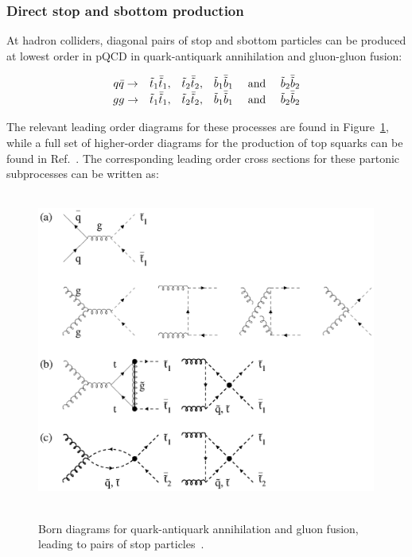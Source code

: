 \subsubsection{Direct stop and sbottom production}

At hadron colliders, diagonal pairs of stop and sbottom particles can be produced at lowest order in pQCD in quark-antiquark annihilation and gluon-gluon fusion:

\begin{equation}
\begin{matrix}
q \bar{q} \rightarrow & \tilde{t}_1 \bar{\tilde{t}}_1, & \tilde{t}_2 \bar{\tilde{t}}_2, & \tilde{b}_1 \bar{\tilde{b}}_1 &\text{  and  } & \tilde{b}_2 \bar{\tilde{b}}_2\\
gg        \rightarrow & \tilde{t}_1 \bar{\tilde{t}}_1, & \tilde{t}_2 \bar{\tilde{t}}_2, & \tilde{b}_1 \bar{\tilde{b}}_1 &\text{  and  } & \tilde{b}_2 \bar{\tilde{b}}_2 \\
\end{matrix}
\label{eq:DirectStopSbottomProduction}
\end{equation}

The relevant leading order diagrams for these processes are found in Figure~\ref{fig:StopProductionDiagrams}, while a full set of higher-order diagrams for the production of top squarks can be found in Ref.~\cite{Beenakker:1997ut}.
The corresponding leading order cross sections for these partonic subprocesses can be written as:

\begin{figure}[!ht]
\begin{center}
\mbox{
\includegraphics[trim=0.8cm 5.7cm 0cm 0cm, clip=true, width=0.995\textwidth]{BeyondSM/Figures/feyn_fin.eps}
}
\end{center}
\caption[Born diagrams for quark-antiquark annihilation and gluon fusion, leading to pairs of stop particles.]{Born diagrams for quark-antiquark annihilation and gluon fusion, leading to pairs of stop particles~\cite{Beenakker:1997ut}.}
\label{fig:StopProductionDiagrams}
\end{figure}

